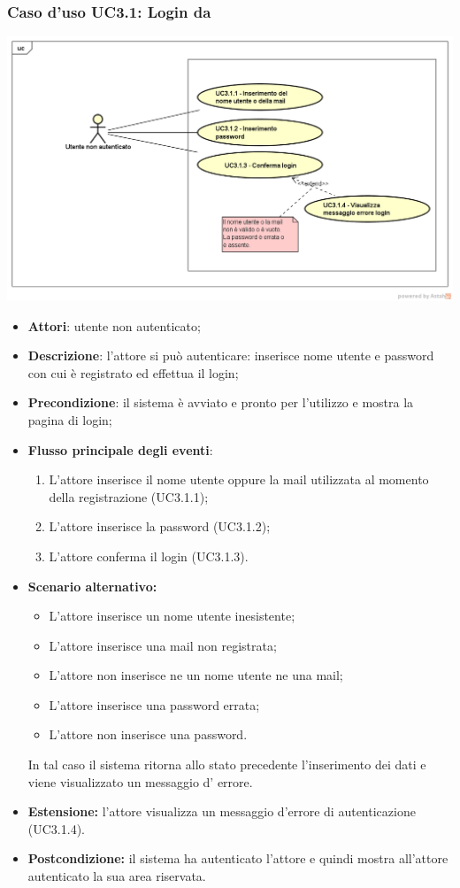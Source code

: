 \subsubsection{Caso d'uso UC3.1: Login da \progetto}
\begin{center}
	\includegraphics[scale=0.5]{UML/UC3_1.png}
\end{center}
\begin{itemize}
	\item \textbf{Attori}: utente non autenticato;
	\item \textbf{Descrizione}: l'attore si può autenticare: inserisce nome utente e password con cui è registrato ed effettua il login;
	\item \textbf{Precondizione}: il sistema è avviato e pronto per l'utilizzo e mostra la pagina di login;
	\item \textbf{Flusso principale degli eventi}:
	\begin{enumerate}
		\item L'attore inserisce il nome utente oppure la mail utilizzata al momento della registrazione (UC3.1.1);
		\item L'attore inserisce la password (UC3.1.2);
		\item L'attore conferma il login (UC3.1.3).
	\end{enumerate}
	\item \textbf{Scenario alternativo:}
	\begin{itemize}
		\item L'attore inserisce un nome utente inesistente;
		\item L'attore inserisce una mail non registrata;
		\item L'attore non inserisce ne un nome utente ne una mail;
		\item L'attore inserisce una password errata;
		\item L'attore non inserisce una password.
	\end{itemize}
	In tal caso il sistema ritorna allo stato precedente l'inserimento dei dati e viene visualizzato un messaggio d' errore.
	\item \textbf{Estensione:} l'attore visualizza un messaggio d'errore di autenticazione (UC3.1.4).
	\item \textbf{Postcondizione:} il sistema ha autenticato l'attore e quindi mostra all'attore autenticato la sua area riservata.
\end{itemize}

